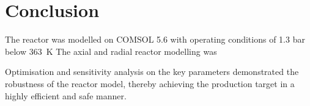 \section{Conclusion} \label{sec:conclusion}
The reactor was modelled on COMSOL 5.6 with operating conditions of 1.3 bar below \SI{363}{\K} 
The axial and radial reactor modelling was 

Optimisation and sensitivity analysis on the key parameters demonstrated the robustness of the reactor model, thereby achieving the production target in a highly efficient and safe manner. 